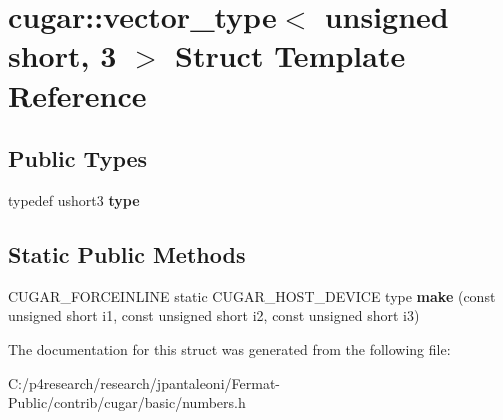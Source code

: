 \hypertarget{structcugar_1_1vector__type_3_01unsigned_01short_00_013_01_4}{}\section{cugar\+:\+:vector\+\_\+type$<$ unsigned short, 3 $>$ Struct Template Reference}
\label{structcugar_1_1vector__type_3_01unsigned_01short_00_013_01_4}
\subsection*{Public Types}
\begin{DoxyCompactItemize}
\item 
\mbox{\label{structcugar_1_1vector__type_3_01unsigned_01short_00_013_01_4_aa7f1f80111f88ab3081a908e089a1ce6}} 
typedef ushort3 {\bfseries type}
\end{DoxyCompactItemize}
\subsection*{Static Public Methods}
\begin{DoxyCompactItemize}
\item 
\mbox{\label{structcugar_1_1vector__type_3_01unsigned_01short_00_013_01_4_ab5d36aace867ffa669c85ae8f5f2fa46}} 
C\+U\+G\+A\+R\+\_\+\+F\+O\+R\+C\+E\+I\+N\+L\+I\+NE static C\+U\+G\+A\+R\+\_\+\+H\+O\+S\+T\+\_\+\+D\+E\+V\+I\+CE type {\bfseries make} (const unsigned short i1, const unsigned short i2, const unsigned short i3)
\end{DoxyCompactItemize}


The documentation for this struct was generated from the following file\+:\begin{DoxyCompactItemize}
\item 
C\+:/p4research/research/jpantaleoni/\+Fermat-\/\+Public/contrib/cugar/basic/numbers.\+h\end{DoxyCompactItemize}

